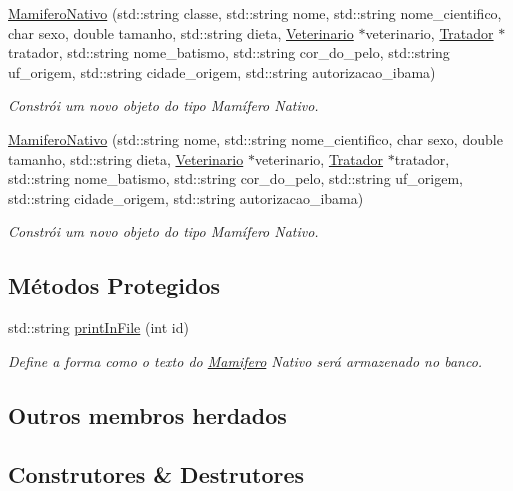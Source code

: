 \begin{DoxyCompactItemize}
\hyperlink{classMamiferoNativo_a33beb16c02c8d9c932bd4a1dd40c0793}{Mamifero\+Nativo} (std\+::string classe, std\+::string nome, std\+::string nome\+\_\+cientifico, char sexo, double tamanho, std\+::string dieta, \hyperlink{classVeterinario}{Veterinario} $\ast$veterinario, \hyperlink{classTratador}{Tratador} $\ast$tratador, std\+::string nome\+\_\+batismo, std\+::string cor\+\_\+do\+\_\+pelo, std\+::string uf\+\_\+origem, std\+::string cidade\+\_\+origem, std\+::string autorizacao\+\_\+ibama)
\begin{DoxyCompactList}\small\item\em Constrói um novo objeto do tipo Mamífero Nativo. \end{DoxyCompactList}\item 
\hyperlink{classMamiferoNativo_aeec3356191f1b6e80ab495a9016b5dae}{Mamifero\+Nativo} (std\+::string nome, std\+::string nome\+\_\+cientifico, char sexo, double tamanho, std\+::string dieta, \hyperlink{classVeterinario}{Veterinario} $\ast$veterinario, \hyperlink{classTratador}{Tratador} $\ast$tratador, std\+::string nome\+\_\+batismo, std\+::string cor\+\_\+do\+\_\+pelo, std\+::string uf\+\_\+origem, std\+::string cidade\+\_\+origem, std\+::string autorizacao\+\_\+ibama)
\begin{DoxyCompactList}\small\item\em Constrói um novo objeto do tipo Mamífero Nativo. \end{DoxyCompactList}\end{DoxyCompactItemize}
\subsection*{Métodos Protegidos}
\begin{DoxyCompactItemize}
\item 
std\+::string \hyperlink{classMamiferoNativo_ae2f2b00cb6720cea2780ebef78be52ea}{print\+In\+File} (int id)
\begin{DoxyCompactList}\small\item\em Define a forma como o texto do \hyperlink{classMamifero}{Mamifero} Nativo será armazenado no banco. \end{DoxyCompactList}\end{DoxyCompactItemize}
\subsection*{Outros membros herdados}


\subsection{Construtores \& Destrutores}
\mbox{\label{classMamiferoNativo_a7c56682680010d93b58925b766afc798}} 
